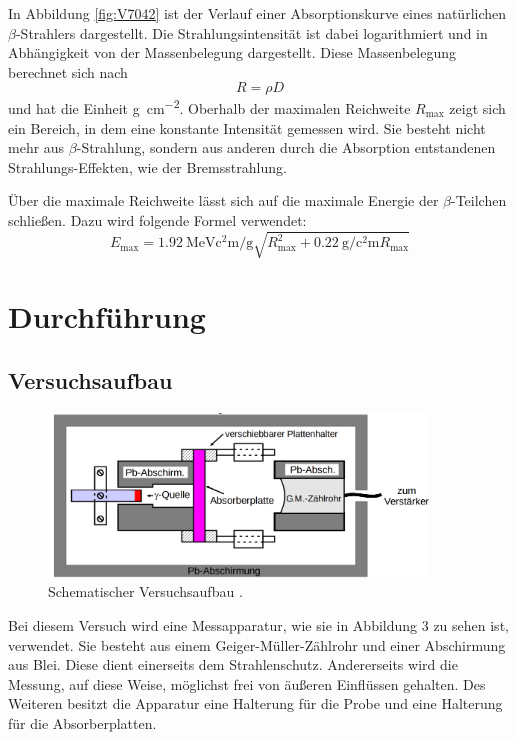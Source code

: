 \documentclass[
  bibliography=totoc,     %
  captions=tableheading,  %
  titlepage=firstiscover, %
]{scrartcl}
\begin{document}
In Abbildung \ref{fig:V7042} ist der Verlauf einer Absorptionskurve eines natürlichen
$\beta$-Strahlers dargestellt. Die Strahlungsintensität ist dabei logarithmiert
und in Abhängigkeit von der Massenbelegung dargestellt. Diese Massenbelegung
berechnet sich nach
\begin{equation}
  R = \rho D
  \label{eqn:massenbel}
\end{equation}
und hat die Einheit \si{\gram\per\square\centi\meter}.
Oberhalb der maximalen Reichweite $R_\mathup{max}$ zeigt sich ein Bereich,
in dem eine konstante Intensität gemessen wird. Sie besteht nicht mehr aus
$\beta$-Strahlung, sondern aus anderen durch die Absorption entstandenen
Strahlungs-Effekten, wie der Bremsstrahlung.

\noindent
Über die maximale Reichweite lässt sich auf die maximale Energie der $\beta$-Teilchen
schließen. Dazu wird folgende Formel verwendet:
\begin{equation}
  E_\mathup{max} = \SI{1.92}{\mega\electronvolt\square\centi\meter\per\gram} \sqrt{R_\mathup{max}^2 + \SI{0.22}{\gram\per\square\centi\meter} R_\mathup{max}}
  \label{eqn:E_max}
\end{equation}


\section{Durchführung}
\label{sec:durchführung}
\subsection{Versuchsaufbau}
\begin{figure}[htb]
  \centering
  \includegraphics[width=0.9\textwidth]{V7043.png}
  \caption{Schematischer Versuchsaufbau \cite{anleitung}.}
  \label{fig:V7043}
\end{figure}
Bei diesem Versuch wird eine Messapparatur, wie sie in Abbildung 3
zu sehen ist, verwendet. Sie besteht aus einem Geiger-Müller-Zählrohr und einer
Abschirmung aus Blei. Diese dient einerseits dem Strahlenschutz. Andererseits
wird die Messung, auf diese Weise, möglichst frei von äußeren Einflüssen gehalten.
Des Weiteren besitzt die Apparatur eine Halterung für die Probe und eine Halterung
für die Absorberplatten.
\end{document}
